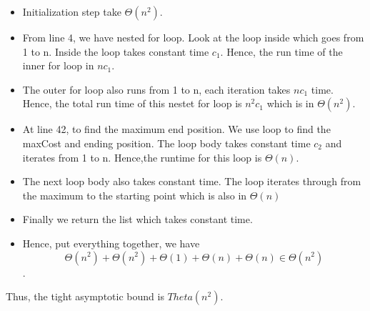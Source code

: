 \documentclass{cpsc413Solutions}
\begin{document}
\begin{problemlist}
\begin{problem}
\begin{problem}
\begin{answer}
\begin{enumerate}
    \begin{itemize}
        \item Initialization step take $\Theta(n^2)$.
        \item From line 4, we have nested for loop. Look at the loop inside which goes from 1 to n. Inside the loop takes constant time $c_1$. Hence, the run time of the inner for loop in $nc_1$.
        \item The outer for loop also runs from 1 to n, each iteration takes $nc_1$ time. Hence, the total run time of this nestet for loop is $n^2c_1$ which is in $\Theta(n^2)$.
        \item At line 42, to find the maximum end position. We use loop to find the maxCost and ending position. The loop body takes constant time $c_2$ and iterates from 1 to n. Hence,the runtime for this loop is $\Theta(n)$.
        \item The next loop body also takes constant time. The loop iterates through from the maximum to the starting point which is also in $\Theta(n)$
        \item Finally we return the list which takes constant time.
        \item Hence, put everything together, we have $$\Theta(n^2) + \Theta(n^2) + \Theta(1) +\Theta(n) +\Theta(n) \in \Theta(n^2) $$.
    \end{itemize}
    Thus, the tight asymptotic bound is $Theta(n^2)$.
\end{enumerate}
\end{answer}
\end{problem}
\end{problem}

\end{problemlist}
\end{document}
